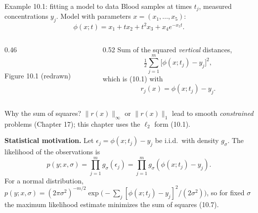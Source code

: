 \documentclass[aspectratio=169,12pt]{beamer}
\newcommand{\eqn}[1]{\text{\small(#1)}}
\begin{document}
\begin{frame}{Example 10.1: fitting a model to data}
  Blood samples at times $t_{j}$, measured concentrations $y_{j}$. Model with parameters
  $x=(x_{1},\dots,x_{5})$:
  \[ \phi(x;t)=x_{1}+tx_{2}+t^{2}x_{3}+x_{4}e^{-x_{5}t} . \tag{10.6} \]
  \begin{columns}[T,onlytextwidth]
    \begin{column}{0.46\textwidth}
      \begin{center}
      \\
      {\small Figure 10.1 (redrawn)}
      \end{center}
    \end{column}
    \begin{column}{0.52\textwidth}
      Sum of the squared \emph{vertical} distances,
      \[ \tfrac12\sum_{j=1}^{m}\big[\phi(x;t_{j})-y_{j}\big]^{2}, \tag{10.7} \]
      which is (10.1) with
      \[ r_{j}(x)=\phi(x;t_{j})-y_{j} . \tag{10.8} \]
    \end{column}
  \end{columns}
\end{frame}

\begin{frame}{Why the sum of squares?}
  $\|r(x)\|_{\infty}$ or $\|r(x)\|_{1}$ \eqn{10.11} lead to smooth \emph{constrained} problems (Chapter 17);
  this chapter uses the $\ell_{2}$ form (10.1).

  \vspace{0.2em}
  \textbf{Statistical motivation.} Let $\epsilon_{j}=\phi(x;t_{j})-y_{j}$ be i.i.d.\ with density $g_{\sigma}$.
  The likelihood of the observations is
  \[ p(y;x,\sigma)=\prod_{j=1}^{m}g_{\sigma}(\epsilon_{j})=\prod_{j=1}^{m}g_{\sigma}(\phi(x;t_{j})-y_{j}) . \tag{10.12} \]
  For a normal distribution,
  $p(y;x,\sigma)=(2\pi\sigma^{2})^{-m/2}\exp\big(-\sum_{j}[\phi(x;t_{j})-y_{j}]^{2}/(2\sigma^{2})\big)$,
  so for fixed $\sigma$ \alert{the maximum likelihood estimate minimizes the sum of squares (10.7).}
\end{frame}
\end{document}
